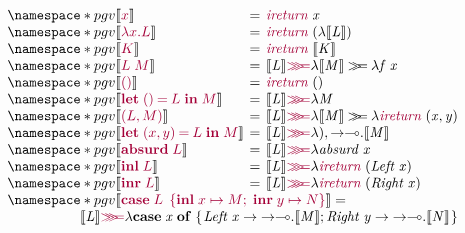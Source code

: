 \documentclass[sigplan,screen]{acmart}
\newcommand{\Conid}[1]{\mathit{#1}}
\newcommand{\Varid}[1]{\mathit{#1}}
\newcommand{\bind}{\mathbin{>\!\!\!>\mkern-6.7mu=}}
\newcommand*\hsUnrestrictedArrow[3]{#1}
\newcommand*\hsLambdaPeriod[3]{#3\global\let\hsArrow=\hsUnrestrictedArrow}
\newcommand\hsLambdaCmd{\global\let\hsArrow=\hsLambdaPeriod}
\begin{document}
\[
  \setlength{\arraycolsep}{2pt}
  \begin{array}{lcl}
    \pgv{\tosesh{\tm{x}}}
    &=
    &\ensuremath{\tm{\Varid{ireturn}}\;\Varid{x}}
    \\
    \pgv{\tosesh{\tm{\lambda x.L}}}
    &=
    &\ensuremath{\tm{\Varid{ireturn}}\;(\lambda \hsLambdaCmd \Varid{x}\hsArrow{\rightarrow }{\multimap }{\mathpunct{.}}\tosesh{\Conid{L}})}
    \\
    \pgv{\tosesh{\tm{K}}}
    &=
    &\ensuremath{\tm{\Varid{ireturn}}\;\tosesh{\Conid{K}}}
    \\
    \pgv{\tosesh{\tm{L\;M}}}
    &=
    &\ensuremath{\tosesh{\Conid{L}}\tm{\ibind}\lambda \hsLambdaCmd \Varid{f}\hsArrow{\rightarrow }{\multimap }{\mathpunct{.}}\tosesh{\Conid{M}}\bind \lambda \hsLambdaCmd \Varid{x}\hsArrow{\rightarrow }{\multimap }{\mathpunct{.}}\Varid{f}\;\Varid{x}}
    \\
    \pgv{\tosesh{\tm{\unit}}}
    &=
    &\ensuremath{\tm{\Varid{ireturn}}\;()}
    \\
    \pgv{\tosesh{\tm{\letunit{L}{M}}}}
    &=
    &\ensuremath{\tosesh{\Conid{L}}\tm{\ibind}\lambda \hsLambdaCmd ()\hsArrow{\rightarrow }{\multimap }{\mathpunct{.}}\Conid{M}}
    \\
    \pgv{\tosesh{\tm{\pair{L}{M}}}}
    &=
    &\ensuremath{\tosesh{\Conid{L}}\tm{\ibind}\lambda \hsLambdaCmd \Varid{x}\hsArrow{\rightarrow }{\multimap }{\mathpunct{.}}\tosesh{\Conid{M}}\bind \lambda \hsLambdaCmd \Varid{y}\hsArrow{\rightarrow }{\multimap }{\mathpunct{.}}\tm{\Varid{ireturn}}\;(\Varid{x},\Varid{y})}
    \\
    \pgv{\tosesh{\tm{\letpair{x}{y}{L}{M}}}}
    &=
    &\ensuremath{\tosesh{\Conid{L}}\tm{\ibind}\lambda \hsLambdaCmd (\Varid{x},\Varid{y})\hsArrow{\rightarrow }{\multimap }{\mathpunct{.}}\tosesh{\Conid{M}}}
    \\
    \pgv{\tosesh{\tm{\absurd{L}}}}
    &=
    &\ensuremath{\tosesh{\Conid{L}}\tm{\ibind}\lambda \hsLambdaCmd \Varid{x}\hsArrow{\rightarrow }{\multimap }{\mathpunct{.}}\Varid{absurd}\;\Varid{x}}
    \\
    \pgv{\tosesh{\tm{\inl{L}}}}
    &=
    &\ensuremath{\tosesh{\Conid{L}}\tm{\ibind}\lambda \hsLambdaCmd \Varid{x}\hsArrow{\rightarrow }{\multimap }{\mathpunct{.}}\tm{\Varid{ireturn}}\;(\Conid{Left}\;\Varid{x})}
    \\
    \pgv{\tosesh{\tm{\inr{L}}}}
    &=
    &\ensuremath{\tosesh{\Conid{L}}\tm{\ibind}\lambda \hsLambdaCmd \Varid{x}\hsArrow{\rightarrow }{\multimap }{\mathpunct{.}}\tm{\Varid{ireturn}}\;(\Conid{Right}\;\Varid{x})}
    \\
    \multicolumn{3}{l}{\pgv{\tosesh{\tm{\casesum{L}{x}{M}{y}{N}}}} =}
    \\
    \multicolumn{3}{r}{\ensuremath{\tosesh{\Conid{L}}\tm{\ibind}\lambda \hsLambdaCmd \Varid{x}\hsArrow{\rightarrow }{\multimap }{\mathpunct{.}}\mathbf{case}\;\Varid{x}\;\mathbf{of}\;\{\mskip1.5mu \Conid{Left}\;\Varid{x}\hsArrow{\rightarrow }{\multimap }{\mathpunct{.}}\tosesh{\Conid{M}};\Conid{Right}\;\Varid{y}\hsArrow{\rightarrow }{\multimap }{\mathpunct{.}}\tosesh{\Conid{N}}\mskip1.5mu\}}}
  \end{array}
\]
\end{document}
